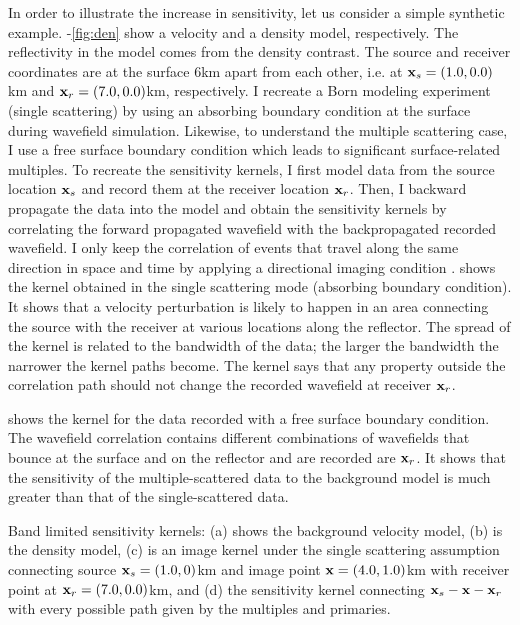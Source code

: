 In order to illustrate the increase in sensitivity, let us
consider a simple synthetic example. 
-\ref{fig:den} show a velocity and a density model, respectively.
 The reflectivity in the model comes from the density contrast. The source 
and receiver coordinates are at the surface $6$km apart from each 
other, i.e.  at ${\bf x}_s=(1.0,0.0)$km and ${\bf x}_r=(7.0,0.0)$km, respectively. 
I recreate a Born modeling experiment (single scattering) 
by using an absorbing boundary condition at the surface during wavefield simulation. Likewise,
 to understand the multiple scattering case, I use a free surface boundary condition which
leads to significant surface-related multiples. 
  To recreate the sensitivity kernels, I first model data from the source location ${\bf x}_s$ 
and record them at the receiver location ${\bf x}_r$. Then, I backward propagate the data
into the model and obtain the sensitivity kernels by correlating the forward propagated
wavefield with the backpropagated recorded wavefield. I only keep the correlation 
of events that travel along the same direction in space  and time by applying a directional
imaging condition \citep{liu:S29}. 
    shows the kernel obtained in the single scattering 
mode (absorbing boundary condition). It shows that a velocity perturbation is likely 
to happen in an area connecting the source with the receiver at various locations along
the reflector.
The spread of the kernel is related to the bandwidth of the data; the larger the bandwidth
the narrower the kernel paths become. The kernel says that any property outside the correlation
path should not change the recorded wavefield at receiver ${\bf x}_r$. 

 shows the kernel for the data recorded with a free surface boundary
condition. The wavefield correlation contains different combinations of wavefields that bounce
at  the surface and on the reflector and are recorded are  ${\bf x}_r$. 
 It shows that the sensitivity of the multiple-scattered data to the background model is much 
greater than that of the  single-scattered data.  





%
{Band limited sensitivity kernels: (a) shows the background velocity model, (b) is the density model, (c) is an image
kernel under the single scattering assumption connecting source ${\bf x}_s =(1.0,0)$km  and
  image point ${\bf x}=(4.0,1.0)$km with receiver point at ${\bf x}_r=(7.0,0.0)$km, and (d) the sensitivity 
kernel connecting ${\bf x}_s-{\bf x}-{\bf x}_r$ with every possible path given by the multiples and primaries. }


